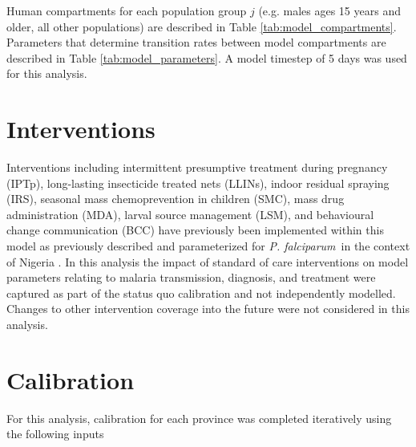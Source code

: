 \documentclass[doublespacing]{bmcart}
\newcommand{\pf}{\textit{P. falciparum}}
\newcommand{\males}{males ages 15 years and older}
\newcommand{\gen}{all other populations}
\begin{document}
Human compartments for each population group $j$ (e.g. \males, \gen) are described in Table \ref{tab:model_compartments}. Parameters that determine transition rates between model compartments are described in Table \ref{tab:model_parameters}. A model timestep of 5 days was used for this analysis.

\section*{Interventions}

Interventions including intermittent presumptive treatment during pregnancy (IPTp), long-lasting insecticide treated nets (LLINs), indoor residual spraying (IRS), seasonal mass chemoprevention in children (SMC), mass drug administration (MDA), larval source management (LSM), and behavioural change communication (BCC) have previously been implemented within this model as previously described and parameterized for \pf~in the context of Nigeria \cite{scott2017}. In this analysis the impact of standard of care interventions on model parameters relating to malaria transmission, diagnosis, and treatment were captured as part of the status quo calibration and not independently modelled. Changes to other intervention coverage into the future were not considered in this analysis.

\section*{Calibration}

For this analysis, calibration for each province was completed iteratively using the following inputs
\end{document}
